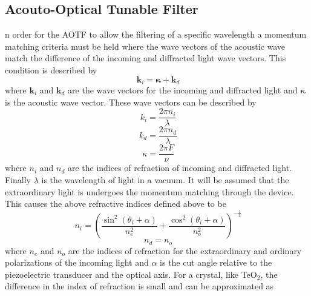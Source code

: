 \documentclass[12pt]{article}
\begin{document}
\subsection{Acouto-Optical Tunable Filter}

n order for the AOTF to allow the filtering of a specific wavelength a momentum matching criteria must be held where the wave vectors of the acoustic wave match the difference of the incoming and diffracted light wave vectors. This condition is described by
\begin{equation}
    \ \mathbf{k}_{i} = \boldsymbol\kappa + \mathbf{k}_{d}
    \label{eqn:3.1:phaseMatching}
\end{equation}
where $\mathbf{k}_{i}$ and $\mathbf{k}_{d}$ are the wave vectors for the incoming and diffracted light and $\boldsymbol\kappa$ is the acoustic wave vector. These wave vectors can be described by
\begin{equation}
    \ k_{i} = \frac{2\pi n_{i}}{\lambda}
    \label{eqn:3.1:incomingWavevector}
\end{equation}
\begin{equation}
    \ k_{d} = \frac{2\pi n_{d}}{\lambda}
    \label{eqn:3.1:diffractedWavevector}
\end{equation}
\begin{equation}
    \ \kappa = \frac{2\pi F}{\nu}
    \label{eqn:3.1:acousticWavevector}
\end{equation}
where $n_{i}$ and $n_{d}$ are the indices of refraction of incoming and diffracted light. Finally $\lambda$ is the wavelength of light in a vacuum. It will be assumed that the extraordinary light is undergoes the momentum matching through the device. This causes the above refractive indices defined above to be
\begin{equation}
    \ n_{i} = \left( \frac{\sin^{2}(\theta_{i}+\alpha)}{n_{e}^{2}} + \frac{\cos^{2}(\theta_{i}+\alpha)}{n_{o}^{2}} \right)^{-\frac{1}{2}}
    \label{eqn:3.1:incomingIndexOfRefraction}
\end{equation}
\begin{equation}
    \ n_{d} = n_{o}
    \label{eqn:3.1:diffractedIndexOfRefraction}
\end{equation}
where $n_{e}$ and $n_{o}$ are the indices of refraction for the extraordinary and ordinary polarizations of the incoming light and $\alpha$ is the cut angle relative to the piezoelectric transducer and the optical axis. For a crystal, like TeO$_{2}$, the difference in the index of refraction is small and can be approximated as \citep{Voloshinov2007}
\end{document}
